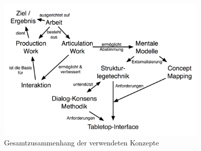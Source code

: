\begin{figure}[htbp]
	\centering
	\includegraphics[width=0.9\textwidth]{img/Schlussbetrachtungen/ArbeitInteraktionMentaleModelleTabletop.png}
	\caption{Gesamtzusammenhang der verwendeten Konzepte}
	\label{fig:img_Schlussbetrachtungen_ArbeitInteraktionMentaleModelleTabletop}
\end{figure}

